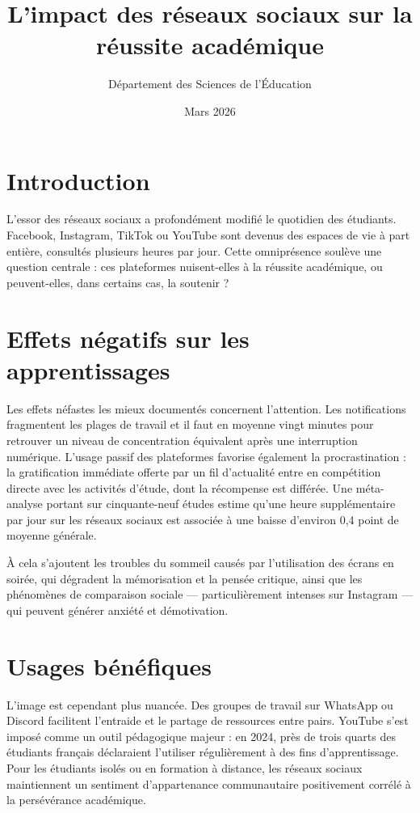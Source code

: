 \documentclass[12pt, a4paper]{article}
\title{\textbf{L'impact des réseaux sociaux sur la réussite académique}}
\author{Département des Sciences de l'Éducation}
\date{Mars 2026}
\begin{document}
\maketitle

\section{Introduction}

L'essor des réseaux sociaux a profondément modifié le quotidien des étudiants. Facebook, Instagram, TikTok ou YouTube sont devenus des espaces de vie à part entière, consultés plusieurs heures par jour. Cette omniprésence soulève une question centrale : ces plateformes nuisent-elles à la réussite académique, ou peuvent-elles, dans certains cas, la soutenir ?

\section{Effets négatifs sur les apprentissages}

Les effets néfastes les mieux documentés concernent l'attention. Les notifications fragmentent les plages de travail et il faut en moyenne vingt minutes pour retrouver un niveau de concentration équivalent après une interruption numérique. L'usage passif des plateformes favorise également la procrastination : la gratification immédiate offerte par un fil d'actualité entre en compétition directe avec les activités d'étude, dont la récompense est différée. Une méta-analyse portant sur cinquante-neuf études estime qu'une heure supplémentaire par jour sur les réseaux sociaux est associée à une baisse d'environ 0,4 point de moyenne générale.

À cela s'ajoutent les troubles du sommeil causés par l'utilisation des écrans en soirée, qui dégradent la mémorisation et la pensée critique, ainsi que les phénomènes de comparaison sociale — particulièrement intenses sur Instagram — qui peuvent générer anxiété et démotivation.

\section{Usages bénéfiques}

L'image est cependant plus nuancée. Des groupes de travail sur WhatsApp ou Discord facilitent l'entraide et le partage de ressources entre pairs. YouTube s'est imposé comme un outil pédagogique majeur : en 2024, près de trois quarts des étudiants français déclaraient l'utiliser régulièrement à des fins d'apprentissage. Pour les étudiants isolés ou en formation à distance, les réseaux sociaux maintiennent un sentiment d'appartenance communautaire positivement corrélé à la persévérance académique.
\end{document}
